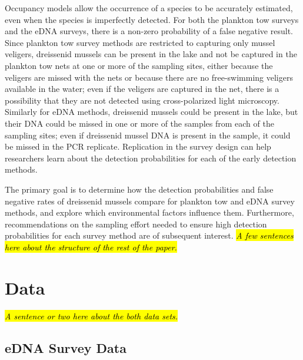 \documentclass[12pt]{article}\usepackage[]{graphicx}\usepackage[]{color}
\begin{document}
Occupancy models allow the occurrence of a species to be accurately estimated, even when the species is imperfectly detected. For both the plankton tow surveys and the eDNA surveys, there is a non-zero probability of a false negative result. Since plankton tow survey methods are restricted to capturing only mussel veligers, dreissenid mussels can be present in the lake and not be captured in the plankton tow nets at one or more of the sampling sites, either because the veligers are missed with the nets or because there are no free-swimming veligers available in the water; even if the veligers are captured in the net, there is a possibility that they are not detected using cross-polarized light microscopy. Similarly for eDNA methods, dreissenid mussels could be present in the lake, but their DNA could be missed in one or more of the samples from each of the sampling sites; even if dreissenid mussel DNA is present in the sample, it could be missed in the PCR replicate. Replication in the survey design can help researchers learn about the detection probabilities for each of the early detection methods. 

The primary goal is to determine how the detection probabilities and false negative rates of dreissenid mussels compare for plankton tow and eDNA survey methods, and explore which environmental factors influence them. Furthermore, recommendations on the sampling effort needed to ensure high detection probabilities for each survey method are of subsequent interest. \hl{\textit{A few sentences here about the structure of the rest of the paper.}}

\section{Data}

\textit{\hl{A sentence or two here about the both data sets.}}

\subsection{eDNA Survey Data}
\end{document}
